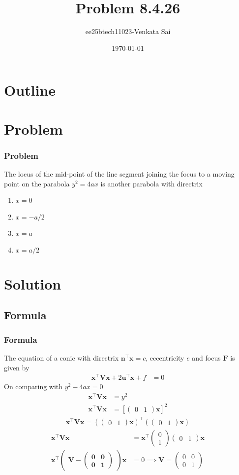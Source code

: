 \documentclass{beamer}
\title{Problem 8.4.26}
\author{ee25btech11023-Venkata Sai}
\date{\today}
\providecommand{\sbrak}[1]{\ensuremath{{}\left[#1\right]}}
\providecommand{\brak}[1]{\ensuremath{\left(#1\right)}}
\theoremstyle{remark}
\newcommand{\myvec}[1]{\ensuremath{\begin{pmatrix}#1\end{pmatrix}}}
\let\vec\mathbf
\numberwithin{equation}{section}
\begin{document}
\begin{frame}
\titlepage
\end{frame}

\section*{Outline}
\begin{frame}
\tableofcontents
\end{frame}

\section{Problem}

\begin{frame}
\frametitle{Problem}
The locus of the mid-point of the line segment joining the focus to a moving point
on the parabola $y^2 = 4ax$ is another parabola with directrix
\begin{enumerate}
    \item $x=0$
    \item $x=-a/2$
    \item $x=a$
    \item $x=a/2$
\end{enumerate}
\end{frame}
\section{Solution}

\subsection{Formula}
\setcounter{section}{1}
\begin{frame}
\frametitle{Formula}
The equation of a conic with directrix $\vec{n}^\top \vec{x} = c$, eccentricity $e$ and focus $\vec{F}$ is given
by
\begin{align}
  \vec{x}^\top\vec{V}\vec{x} + 2\vec{u}^\top\vec{x} + f &= 0 
\end{align}
On comparing with $y^2-4ax=0$
\begin{align}
    \vec{x}^\top\vec{V}\vec{x}&= y^2\\  
    \vec{x}^\top\vec{V}\vec{x}&= \sbrak{\myvec{0 &1}\vec{x}}^2 
    \end{align}
    \begin{align}
     \vec{x}^\top\vec{V}\vec{x}= \brak{\myvec{0 &1}\vec{x}}^\top\brak{\myvec{0 &1}\vec{x}}\end{align}
     \begin{align}
         \vec{x}^\top\vec{V}\vec{x}&= \vec{x}^\top\myvec{0 \\1}\myvec{0 &1}\vec{x}\\
         \vec{x}^\top\myvec{\vec{V-\myvec{0 &0\\0&1}}}\vec{x}&=0 \implies \vec{V}=\myvec{0 &0\\0&1}
     \end{align}
\end{frame}
\end{document}
